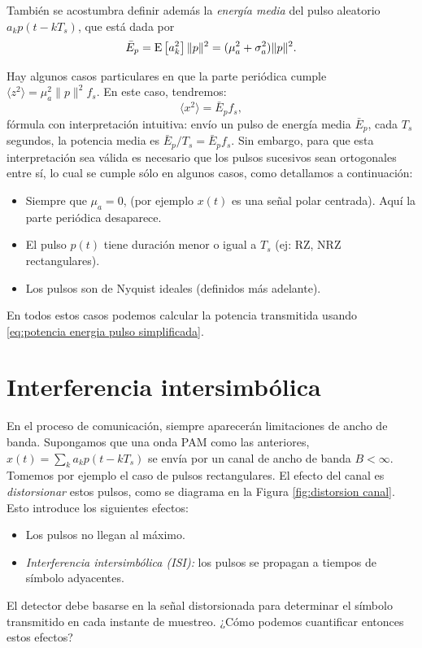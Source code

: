También se acostumbra definir además la \emph{energía media} del pulso aleatorio $a_k p(t-kT_s)$,
que está dada por
\begin{align*}
    \bar{E}_p = \mathrm{E}\left[a_k^2\right] \|p\|^2  = (\mu_a^2+ \sigma_a^2)\|p\|^2 .
\end{align*}

Hay algunos casos particulares en que la parte periódica cumple  $\langle
z^2\rangle = \mu_a^2 \|p\|^2 f_s$. En este caso, tendremos:
\begin{equation}\label{eq:potencia energia pulso simplificada}
    \langle x^2\rangle  = \bar{E}_p f_s,
\end{equation}
fórmula con interpretación intuitiva: envío un pulso de energía media $\bar{E}_p$, cada $T_s$ segundos,
la potencia media es $\bar{E}_p/T_s = \bar{E}_p f_s$. Sin embargo, para que esta interpretación sea válida es necesario que los pulsos
sucesivos sean ortogonales entre sí, lo cual se cumple sólo en algunos casos, como detallamos a continuación:
\begin{itemize}
    \item Siempre que $\mu_a=0$, (por ejemplo $x(t)$ es una señal polar centrada). Aquí la parte periódica desaparece.
    \item El pulso $p(t)$ tiene duración menor o igual a $T_s$ (ej: RZ, NRZ rectangulares).
    \item Los pulsos son de Nyquist ideales (definidos más adelante).
\end{itemize}
En todos estos casos podemos calcular la potencia transmitida usando \eqref{eq:potencia energia pulso simplificada}.

\section{Interferencia intersimbólica}\label{sec:interferencia intersimbolica}

En el proceso de comunicación, siempre aparecerán limitaciones de ancho de banda. Supongamos que una onda PAM como las anteriores, $x(t)=\sum_k a_k p(t-kT_s)$ se envía por un canal de ancho de banda $B<\infty$. Tomemos por ejemplo el caso de pulsos rectangulares. El efecto del canal es \emph{distorsionar} estos pulsos, como se diagrama en la Figura \ref{fig:distorsion canal}. Esto introduce los siguientes efectos:
\begin{itemize}
    \item Los pulsos no llegan al máximo.
    \item \emph{Interferencia intersimbólica (ISI):} los pulsos se propagan a tiempos de símbolo adyacentes.
\end{itemize}
El detector debe basarse en la señal distorsionada para determinar el símbolo transmitido en cada instante de muestreo. ¿Cómo podemos cuantificar entonces estos efectos?

